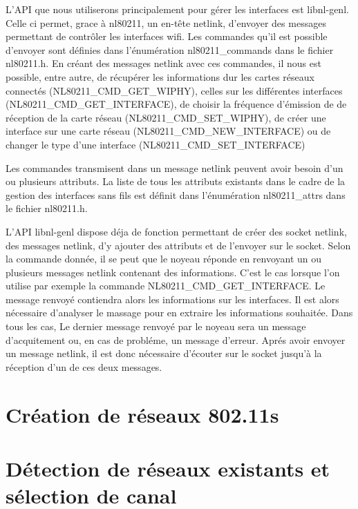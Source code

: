 L'API que nous utiliserons principalement pour gérer les interfaces est libnl-genl. Celle ci permet, grace à nl80211, un
en-tête netlink, d'envoyer des messages permettant de contrôler les interfaces wifi. Les commandes qu'il est possible d'envoyer
sont définies dans l'énumération nl80211\_commands dans le fichier nl80211.h. En créant des messages netlink avec ces commandes,
il nous est possible, entre autre, de récupérer les informations dur les cartes réseaux connectés (NL80211\_CMD\_GET\_WIPHY),
celles sur les différentes interfaces (NL80211\_CMD\_GET\_INTERFACE), de choisir la fréquence d'émission de de réception de la
carte réseau (NL80211\_CMD\_SET\_WIPHY), de créer une interface sur une carte réseau (NL80211\_CMD\_NEW\_INTERFACE) ou de 
changer le type d'une interface (NL80211\_CMD\_SET\_INTERFACE)


Les commandes transmisent dans un message netlink peuvent avoir besoin d'un ou plusieurs attributs. La liste de tous les 
attributs existants dans le cadre de la gestion des interfaces sans fils est définit dans l'énumération nl80211\_attrs dans
le fichier nl80211.h.

L'API libnl-genl dispose déja de fonction permettant de créer des socket netlink, des messages netlink, d'y ajouter des attributs
et de l'envoyer sur le socket. Selon la commande donnée, il se peut que le noyeau réponde en renvoyant un ou plusieurs messages
netlink contenant des informations. C'est le cas lorsque l'on utilise par exemple la commande NL80211\_CMD\_GET\_INTERFACE.
Le message renvoyé contiendra alors les informations sur les interfaces. Il est alors nécessaire d'analyser le massage pour 
en extraire les informations souhaitée. Dans tous les cas, Le dernier message renvoyé par le noyeau sera un message
d'acquitement ou, en cas de probléme, un message d'erreur. Aprés avoir envoyer un message netlink, il est donc nécessaire
d'écouter sur le socket jusqu'à la réception d'un de ces deux messages.

\section{Création de réseaux 802.11s}

\section{Détection de réseaux existants et sélection de canal}

